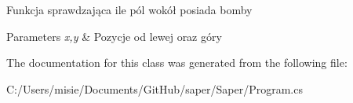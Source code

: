 Funkcja sprawdzająca ile pól wokół posiada bomby 
\begin{DoxyParams}{Parameters}
{\em x,y} & Pozycje od lewej oraz góry \\
\hline
\end{DoxyParams}


The documentation for this class was generated from the following file\+:\begin{DoxyCompactItemize}
\item 
C\+:/\+Users/misie/\+Documents/\+Git\+Hub/saper/\+Saper/Program.\+cs\end{DoxyCompactItemize}
